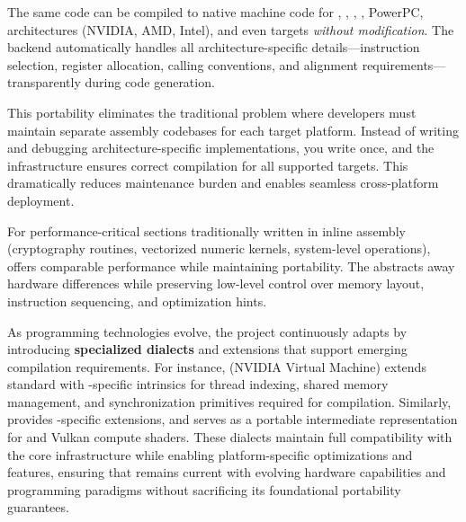 The same  code can be compiled to native machine code for , , , , PowerPC,  architectures (NVIDIA, AMD, Intel), and even  targets \textit{without modification}. The  backend automatically handles all architecture-specific details—instruction selection, register allocation, calling conventions, and alignment requirements—transparently during code generation.

This portability eliminates the traditional problem where developers must maintain separate assembly codebases for each target platform. Instead of writing and debugging architecture-specific implementations, you write  once, and the  infrastructure ensures correct compilation for all supported targets. This dramatically reduces maintenance burden and enables seamless cross-platform deployment.

For performance-critical sections traditionally written in inline assembly (cryptography routines, vectorized numeric kernels, system-level operations),   offers comparable performance while maintaining portability. The  abstracts away hardware differences while preserving low-level control over memory layout, instruction sequencing, and optimization hints.

As programming technologies evolve, the  project continuously adapts by introducing \textbf{specialized  dialects} and extensions that support emerging compilation requirements. For instance, \textbf{ } (NVIDIA Virtual Machine) extends standard   with -specific intrinsics for thread indexing, shared memory management, and synchronization primitives required for  compilation. Similarly, \textbf{ } provides -specific extensions, and \textbf{} serves as a portable intermediate representation for  and Vulkan compute shaders. These dialects maintain full compatibility with the core  infrastructure while enabling platform-specific optimizations and features, ensuring that  remains current with evolving hardware capabilities and programming paradigms without sacrificing its foundational portability guarantees.
